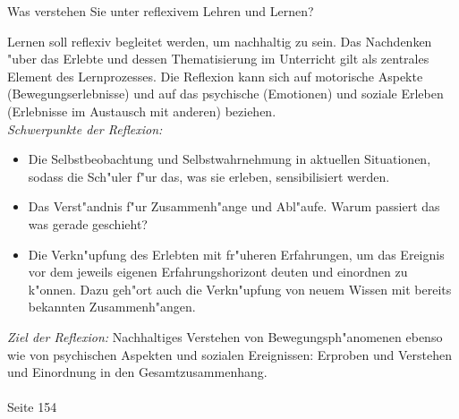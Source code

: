\begin{question}{6}
Was verstehen Sie unter reflexivem Lehren und Lernen?
\end{question}
\begin{solution}
Lernen soll reflexiv begleitet werden, um nachhaltig zu sein. Das Nachdenken "uber das Erlebte und dessen Thematisierung im Unterricht gilt als zentrales Element des Lernprozesses. Die Reflexion kann sich auf motorische Aspekte (Bewegungserlebnisse) und auf das psychische (Emotionen) und soziale Erleben (Erlebnisse im Austausch mit anderen) beziehen.\\
\emph{Schwerpunkte der Reflexion:}
\begin{itemize}
\item Die Selbstbeobachtung und Selbstwahrnehmung in aktuellen Situationen, sodass die Sch"uler f"ur das, was sie erleben, sensibilisiert werden.
\item Das Verst"andnis f"ur Zusammenh"ange und Abl"aufe. Warum passiert das was gerade geschieht?
\item Die Verkn"upfung des Erlebten mit fr"uheren Erfahrungen, um das Ereignis vor dem jeweils eigenen Erfahrungshorizont deuten und einordnen zu k"onnen. Dazu geh"ort auch die Verkn"upfung von neuem Wissen mit bereits bekannten Zusammenh"angen. 
\end{itemize}
\emph{Ziel der Reflexion:} Nachhaltiges Verstehen von Bewegungsph"anomenen ebenso wie von psychischen Aspekten und sozialen Ereignissen: Erproben und Verstehen und Einordnung in den Gesamtzusammenhang.\\\\
 Seite 154
\end{solution}

